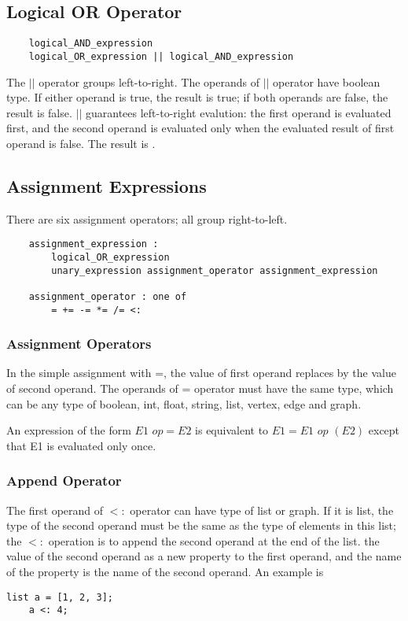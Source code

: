 \documentclass[letterpaper,12pt]{article}
\begin{document}
\subsection{Logical OR Operator}
\begin{lstlisting}
	logical_AND_expression
	logical_OR_expression || logical_AND_expression
\end{lstlisting}
The $||$ operator groups left-to-right. The operands of $||$ operator have boolean type. If either operand is true, the result is true; if both operands are false, the result is false. $||$ guarantees left-to-right evalution: the first operand is evaluated first, and the second operand is evaluated only when the evaluated result of first operand is false. The result is {}.

\subsection{Assignment Expressions}
There are six assignment operators; all group right-to-left.
\begin{lstlisting}
	assignment_expression :
		logical_OR_expression
		unary_expression assignment_operator assignment_expression

	assignment_operator : one of
		= += -= *= /= <:
\end{lstlisting}
\subsubsection{Assignment Operators}
In the simple assignment with =, the value of first operand replaces by the value of second operand. The operands of = operator must have the same type, which can be any type of boolean, int, float, string, list, vertex, edge and graph.\newline

An expression of the form $E1$ $op= E2$ is equivalent to $E1 = E1$ $op$ $(E2)$ except that E1 is evaluated only once.

\subsubsection{Append Operator}
The first operand of $<:$ operator can have type of list or graph. If it is list, the type of the second operand must be the same as the type of elements in this list; the $<:$ operation is to append the second operand at the end of the list. 
the value of the second operand as a new property to the first operand, and the name of the property is the name of the second operand. An example is
\begin{lstlisting}[frame=none]
	list a = [1, 2, 3];
	a <: 4;
\end{lstlisting}
\end{document}
